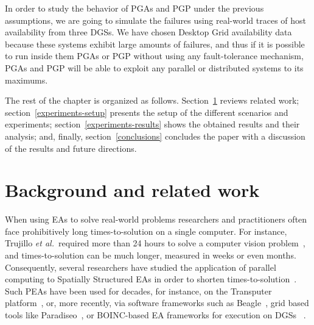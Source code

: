 \documentclass[graybox]{sty/svmult}
\begin{document}
In order to study the behavior of PGAs and PGP under the previous assumptions, we are going to simulate the failures using 
real-world traces of host availability from three DGSs. We have chosen Desktop Grid availability data because these systems
exhibit large amounts of failures, and thus if it is possible to run inside them PGAs or PGP without using any fault-tolerance
mechanism, PGAs and PGP will be able to exploit any parallel or distributed systems to its maximums.

The rest of the chapter is organized as follows. Section~\ref{related-work} reviews related
work; 
section~\ref{experiments-setup} presents the setup of the different
scenarios and experiments; 
section~\ref{experiments-results} shows the obtained results and their
analysis; and, finally, section~\ref{conclusions} concludes the paper with a discussion of the results and future directions.

\section{Background and related work}
\label{related-work}

When using EAs to solve real-world problems researchers and practitioners often face prohibitively
long times-to-solution on a single computer.  For instance,
Trujillo \emph{et al.}~required more than 24 hours to solve a computer
vision problem~\cite{ipgp2}, and times-to-solution can be
much longer, measured in weeks or even months. Consequently,
several researchers have studied the application of parallel
computing to Spatially Structured EAs in order to shorten
times-to-solution~\cite{Fernandez:PGP, spatially-structured-EAs, parallel-ga-survey}.
Such PEAs have been used for decades, for instance, on the Transputer
platform~\cite{transputer}, or, more recently, via software frameworks
such as Beagle~\cite{master-slave-framework-beagle}, grid based tools
like Paradiseo~\cite{grid-parallel-bioinspired-algorithms}, or BOINC-based EA frameworks for
execution on DGSs ~\cite{vmware-boinc-ipgp}.
\end{document}
